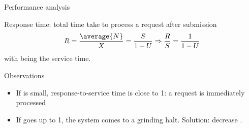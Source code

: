   \begin{slide}{Performance analysis}
    \begin{block}{Response time: total time take to process a request after submission}
      \[ R = \frac{\average{N}}{X} = \frac{S}{1-U} \Rightarrow \frac{R}{S} = \frac{1}{1-U} \]
    with  being the service time.
    \end{block}
    \begin{block}{Observations}
      \begin{itemize}
      \item If  is small, response-to-service time is close to 1: a request is immediately
        processed
      \item If  goes up to 1, the system comes to a grinding halt. \newline Solution: decrease .
      \end{itemize}
    \end{block}
  \end{slide}


